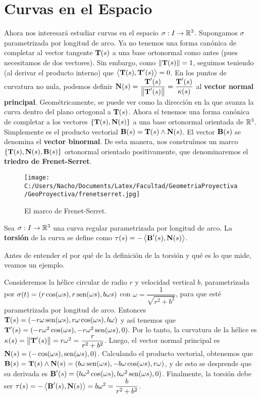 \section{Curvas en el Espacio}

Ahora nos interesará estudiar curvas en el espacio $\sigma:I\to\mathbb{R}^3$. Supongamos $\sigma$ parametrizada por longitud de arco. Ya no tenemos una forma canónica de completar al vector tangente $\operatorname{\mathbf{T}}(s)$ a una base ortonormal como antes (pues necesitamos de dos vectores). Sin embargo, como $\left\| \operatorname{\mathbf{T}}(s) \right\|=1$, seguimos teniendo (al derivar el producto interno) que $\left\langle \operatorname{\mathbf{T}}(s),\operatorname{\mathbf{T}}'(s) \right\rangle=0$. En los puntos de curvatura no nula, podemos definir $\operatorname{\mathbf{N}}(s)=\dfrac{\operatorname{\mathbf{T}}'(s)}{\left\| \operatorname{\mathbf{T}}'(s) \right\|} = \dfrac{\operatorname{\mathbf{T}}'(s)}{\kappa(s)}$ al \textbf{vector normal principal}. Geométricamente, se puede ver como la dirección en la que avanza la curva dentro del plano ortogonal a $\operatorname{\mathbf{T}}(s)$. Ahora sí tenemos una forma canónica de completar a los vectores $\{\operatorname{\mathbf{T}}(s),\operatorname{\mathbf{N}}(s)\}$ a una base ortonormal orientada de $\mathbb{R}^3$. Simplemente es el producto vectorial $\operatorname{\mathbf{B}}(s)=\operatorname{\mathbf{T}}(s)\wedge\operatorname{\mathbf{N}}(s)$. El vector $\operatorname{\mathbf{B}}(s)$ se denomina el \textbf{vector binormal}.  De esta manera, nos construímos un marco $\{\operatorname{\mathbf{T}}(s),\operatorname{\mathbf{N}}(s),\operatorname{\mathbf{B}}(s)\}$ ortonormal orientado positivamente, que denominaremos el \textbf{triedro de Frenet-Serret}.

\begin{figure}[h]
	\centering
		\texttt{[image: C:/Users/Nacho/Documents/Latex/Facultad/GeometriaProyectiva/GeoProyectiva/frenetserret.jpg]}
	\caption{El marco de Frenet-Serret.}
	\label{fig:frenetserret}
\end{figure}

\begin{defn}
Sea $\sigma:I\to\mathbb{R}^3$ una curva regular parametrizada por longitud de arco. La \textbf{torsión} de la curva se define como $\tau(s)=-\left\langle \operatorname{\mathbf{B}}'(s),\operatorname{\mathbf{N}}(s) \right\rangle$.
\end{defn}

Antes de entender el por qué de la definición de la torsión y qué es lo que mide, veamos un ejemplo.

\begin{ex}
Consideremos la hélice circular de radio $r$ y velocidad vertical $b$, parametrizada por $\sigma(t) = (r\cos(\omega s),r\operatorname{sen}(\omega s),b\omega s)$ con $\omega = \dfrac{1}{\sqrt{r^2+b^2}}$, para que esté parametrizada por longitud de arco. Entonces $\operatorname{\mathbf{T}}(s)=(-r\omega\operatorname{sen}(\omega s),r\omega\cos(\omega s),b\omega)$ y así tenemos que $\operatorname{\mathbf{T}}'(s)=(-r\omega^2\cos(\omega s),-r\omega^2 \operatorname{sen}(\omega s),0)$. Por lo tanto, la curvatura de la hélice es $\kappa(s)=\left\| \operatorname{\mathbf{T}}'(s) \right\| = r\omega^2 = \dfrac{r}{r^2+b^2}$. Luego, el vector normal principal es $\operatorname{\mathbf{N}}(s)=(-\cos(\omega s),\operatorname{sen}(\omega s),0)$. Calculando el producto vectorial, obtenemos que $\operatorname{\mathbf{B}}(s)=\operatorname{\mathbf{T}}(s)\wedge\operatorname{\mathbf{N}}(s)=(b\omega\operatorname{sen}(\omega s),-b\omega\cos(\omega s),r\omega)$, y de esto se desprende que su derivada es $\operatorname{\mathbf{B}}'(s)=(b\omega^2\cos(\omega s),b\omega^2 \operatorname{sen}(\omega s),0)$. Finalmente, la torsión debe ser $\tau(s)=-\left\langle \operatorname{\mathbf{B}}'(s),\operatorname{\mathbf{N}}(s) \right\rangle = b\omega^2 = \dfrac{b}{r^2+b^2}$.
\end{ex}

